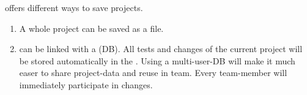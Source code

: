 \jb{} offers different ways to save projects. 
\begin{enumerate}
\item A whole project can be saved as a file. 
\item \jb{} can be  linked with a \bxdb (DB). All tests
 and changes  of the current project will be stored automatically in the \bxdb. Using a
 multi-user-DB will
 make it much easer to share project-data and reuse \gdcases in
 team.   Every team-member will  immediately  participate in changes. 
\end{enumerate}

